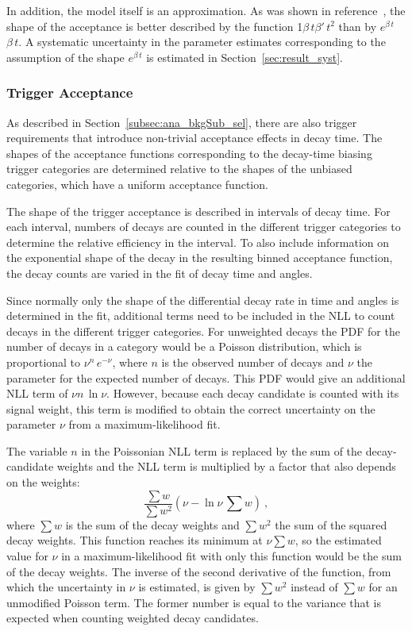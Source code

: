 In addition, the model itself is an approximation. As was shown in reference~\cite{LHCb-ANA-2014-039}, the shape of the acceptance is
better described by the function 1\textplus$\beta\,t$\textplus$\beta'\,t^2$ than by $e^{\beta\,t}$\textplus$\beta\,t$. A
systematic uncertainty in the parameter estimates corresponding to the assumption of the shape $e^{\beta\,t}$ is estimated in
Section~\ref{sec:result_syst}.

\subsubsection{Trigger Acceptance}
As described in Section~\ref{subsec:ana_bkgSub_sel}, there are also trigger requirements that introduce non-trivial acceptance effects in
decay time. The shapes of the acceptance functions corresponding to the decay-time biasing trigger categories are determined relative to
the shapes of the unbiased categories, which have a uniform acceptance function.

The shape of the trigger acceptance is described in intervals of decay time. For each interval, numbers of decays are counted in the
different trigger categories to determine the relative efficiency in the interval. To also include information on the exponential shape of
the decay in the resulting binned acceptance function, the decay counts are varied in the fit of decay time and angles.

Since normally only the shape of the differential decay rate in time and angles is determined in the fit, additional terms need to be
included in the NLL to count decays in the different trigger categories. For unweighted decays the PDF for the number of decays in a
category would be a Poisson distribution, which is proportional to $\nu^n\,e^{-\nu}$, where $n$ is the observed number of decays and $\nu$
the parameter for the expected number of decays. This PDF would give an additional NLL term of $\nu$\textminus$n\,\ln\nu$. However, because
each decay candidate is counted with its signal weight, this term is modified to obtain the correct uncertainty on the parameter $\nu$ from
a maximum-likelihood fit.

The variable $n$ in the Poissonian NLL term is replaced by the sum of the decay-candidate weights and the NLL term is multiplied by a
factor that also depends on the weights:
\begin{equation}
  \label{eq:weightPoisson}
  \frac{\sum w}{\sum w^2}\left( \nu - \ln\nu\,\sum w \right)\ ,
\end{equation}
where $\sum w$ is the sum of the decay weights and $\sum w^2$ the sum of the squared decay weights. This function reaches its minimum at
$\nu$\texteq$\sum w$, so the estimated value for $\nu$ in a maximum-likelihood fit with only this function would be the sum of the decay
weights. The inverse of the second derivative of the function, from which the uncertainty in $\nu$ is estimated, is given by $\sum w^2$
instead of $\sum w$ for an unmodified Poisson term. The former number is equal to the variance that is expected when counting weighted
decay candidates.


